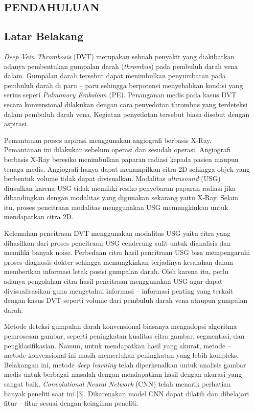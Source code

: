 
\begin{spacing}{1.2}
  \chapter{PENDAHULUAN}
\end{spacing}


\vspace{4ex}

\section{Latar Belakang}
\textit{Deep Vein Thrombosis} (DVT) merupakan sebuah penyakit yang diakibatkan adanya pembentukan gumpalan darah (\textit{thrombus}) pada pembuluh darah vena dalam. Gumpalan darah tersebut dapat menimbulkan penyumbatan pada pembuluh darah di paru – paru sehingga berpotensi menyebabkan kondisi yang serius sepeti \textit{Pulmonory Embolism} (PE)\cite{arta1}. Penanganan medis pada kasus DVT secara konvensional dilakukan dengan cara penyedotan thrombus yang terdeteksi dalam pembuluh darah vena. Kegiatan penyedotan tersebut biasa disebut dengan aspirasi.

Pemantauan proses aspirasi menggunakan angiografi berbasis X-Ray. Pemantauan ini dilakukan sebelum operasi dan sesudah operasi. Angiografi berbasis X-Ray beresiko menimbulkan paparan radiasi kepada pasien maupun tenaga medis. Angiografi hanya dapat menampilkan citra 2D sehingga objek yang berbentuk volume tidak dapat divisualkan\cite{made2020}. Modalitas \textit{ultrasound} (USG) diusulkan karena USG tidak memiliki resiko penyebaran paparan radiasi jika dibandingkan dengan modalitas yang digunakan sekarang yaitu X-Ray. Selain itu, proses pencitraan modalitas menggunakan USG memungkinkan untuk mendapatkan citra 2D.

Kelemahan pencitraan DVT menggunakan modalitas USG yaitu citra yang dihasilkan dari proses pencitraan USG cenderung sulit untuk dianalisis dan memiliki banyak noise. Perbedaan citra hasil pencitraan USG bisa mempengaruhi proses diagnosis dokter sehingga memungkinkan terjadinya kesalahan dalam memberikan informasi letak posisi gumpalan darah. Oleh karena itu, perlu adanya pengolahan citra hasil pencitraan menggunakan USG agar dapat divisualisasikan guna mengetahui informasi – informasi penting yang terkait dengan kasus DVT seperti volume dari pembuluh darah vena ataupun gumpalan darah.

Metode deteksi gumpalan darah konvensional biasanya mengadopsi algoritma pemrosesan gambar, seperti peningkatan kualitas citra gambar, segmentasi, dan pengklasifikasian. Namun, untuk mendapatkan hasil yang akurat, metode – metode konvensional ini masih memerlukan peningkatan yang lebih kompleks. Belakangan ini, metode \textit{deep learning} telah diperkenalkan untuk analisis gambar medis untuk berbagai masalah dengan mendapatkan hasil dengan akurasi yang sangat baik. \textit{Convolutional Neural Network} (CNN) telah menarik perhatian banyak peneliti saat ini [3]. Dikarenakan model CNN dapat dilatih dan dibelajari fitur – fitur sesuai dengan keinginan peneliti.

